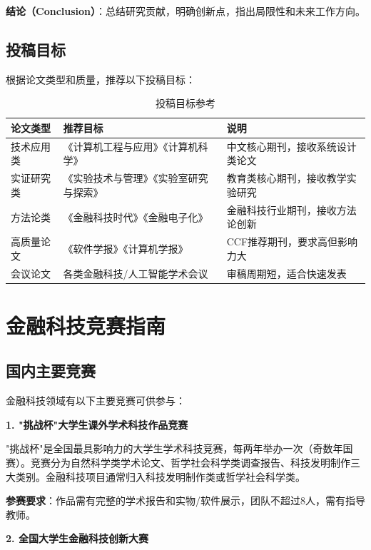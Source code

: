 \textbf{结论（Conclusion）}：总结研究贡献，明确创新点，指出局限性和未来工作方向。

\subsection{投稿目标}

根据论文类型和质量，推荐以下投稿目标：

\begin{table}[H]
\centering
\small
\begin{tabular}{llp{5cm}}
\toprule
\textbf{论文类型} & \textbf{推荐目标} & \textbf{说明} \\
\midrule
技术应用类 & 《计算机工程与应用》《计算机科学》 & 中文核心期刊，接收系统设计类论文 \\
实证研究类 & 《实验技术与管理》《实验室研究与探索》 & 教育类核心期刊，接收教学实验研究 \\
方法论类 & 《金融科技时代》《金融电子化》 & 金融科技行业期刊，接收方法论创新 \\
高质量论文 & 《软件学报》《计算机学报》 & CCF推荐期刊，要求高但影响力大 \\
会议论文 & 各类金融科技/人工智能学术会议 & 审稿周期短，适合快速发表 \\
\bottomrule
\end{tabular}
\caption{投稿目标参考}
\end{table}

\section{金融科技竞赛指南}

\subsection{国内主要竞赛}

金融科技领域有以下主要竞赛可供参与：

\textbf{1. "挑战杯"大学生课外学术科技作品竞赛}

"挑战杯"是全国最具影响力的大学生学术科技竞赛，每两年举办一次（奇数年国赛）。竞赛分为自然科学类学术论文、哲学社会科学类调查报告、科技发明制作三大类别。金融科技项目通常归入科技发明制作类或哲学社会科学类。

\textbf{参赛要求}：作品需有完整的学术报告和实物/软件展示，团队不超过8人，需有指导教师。

\textbf{2. 全国大学生金融科技创新大赛}


